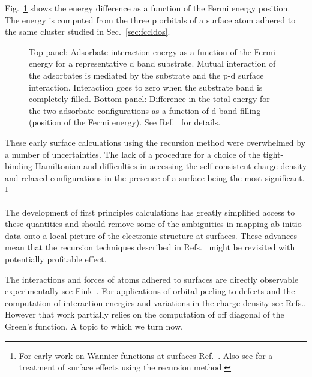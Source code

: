 %

Fig.~\ref{fig:burkesurface} shows the energy difference as a function of the 
Fermi energy position. The energy is computed from the three p orbitals of a 
surface atom adhered to the same cluster studied in Sec.~\ref{sec:fccldos}.
%
\begin{figure}
\begin{center}
{\graphicspath{{./invariance/rec_examples/exorpeel/}}}
\caption{Top panel: Adsorbate interaction energy as a function of the Fermi energy for a representative d band
substrate. Mutual interaction of the adsorbates is mediated by the substrate and the p-d surface interaction.
Interaction goes to zero when the substrate band is completely filled. 
Bottom panel: Difference in the total energy for the two adsorbate configurations as a function of
d-band filling (position of the Fermi energy). See Ref.~\cite{burke76} for details. \label{fig:burkesurface}}
\end{center}
\end{figure}
%

These early surface calculations using the recursion method were overwhelmed 
by a number of uncertainties. The lack of a procedure for a choice of the tight-binding 
Hamiltonian and difficulties in accessing the self consistent charge density
and relaxed configurations in the presence of a surface being the most significant.
\footnote{For early work on Wannier functions at surfaces Ref.~\cite{smith74}. Also see 
\cite{mostoller79} for a treatment of surface effects using the recursion method.}

The development of first principles calculations 
has greatly simplified access to these quantities and should remove 
some of the ambiguities in mapping ab initio data onto a local picture
of the electronic structure at surfaces. These advances mean that the 
recursion techniques described in Refs.~\cite{burke76, haydock79, haydock81} 
might be revisited with potentially profitable effect. 

The interactions and forces of atoms adhered to surfaces are directly 
observable experimentally see Fink~\cite{fink84}.
For applications of orbital peeling to defects and the 
computation of interaction energies and variations in the charge density
see Refs.\cite{gibson93,gibson94}. However that work partially relies 
on the computation of off diagonal of the Green's function. A topic
to which we turn now.


